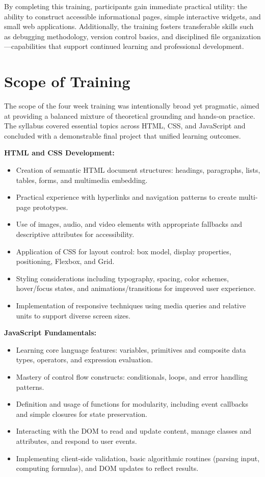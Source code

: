 \documentclass[a4paper,12pt,oneside]{report}
\numberwithin{equation}{chapter}
\numberwithin{figure}{chapter}
\numberwithin{table}{chapter}
\begin{document}
By completing this training, participants gain immediate practical utility: the ability to construct accessible informational pages, simple interactive widgets, and small web applications. Additionally, the training fosters transferable skills such as debugging methodology, version control basics, and disciplined file organization—capabilities that support continued learning and professional development.

\section{Scope of Training}

The scope of the four week training was intentionally broad yet pragmatic, aimed at providing a balanced mixture of theoretical grounding and hands-on practice. The syllabus covered essential topics across HTML, CSS, and JavaScript and concluded with a demonstrable final project that unified learning outcomes.

\textbf{HTML and CSS Development:}
\begin{itemize}
    \item Creation of semantic HTML document structures: headings, paragraphs, lists, tables, forms, and multimedia embedding.
    \item Practical experience with hyperlinks and navigation patterns to create multi-page prototypes.
    \item Use of images, audio, and video elements with appropriate fallbacks and descriptive attributes for accessibility.
    \item Application of CSS for layout control: box model, display properties, positioning, Flexbox, and Grid.
    \item Styling considerations including typography, spacing, color schemes, hover/focus states, and animations/transitions for improved user experience.
    \item Implementation of responsive techniques using media queries and relative units to support diverse screen sizes.
\end{itemize}

\textbf{JavaScript Fundamentals:}
\begin{itemize}
    \item Learning core language features: variables, primitives and composite data types, operators, and expression evaluation.
    \item Mastery of control flow constructs: conditionals, loops, and error handling patterns.
    \item Definition and usage of functions for modularity, including event callbacks and simple closures for state preservation.
    \item Interacting with the DOM to read and update content, manage classes and attributes, and respond to user events.
    \item Implementing client-side validation, basic algorithmic routines (parsing input, computing formulas), and DOM updates to reflect results.
\end{itemize}
\end{document}
